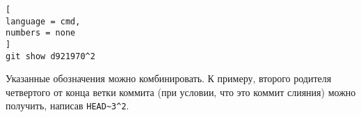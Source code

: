 \documentclass[%
	11pt,
	a4paper,
	utf8,
		]{article}
\begin{document}
\begin{lstlisting}[
language = cmd,
numbers = none
]
git show d921970^2
\end{lstlisting}

Указанные обозначения можно комбинировать. К примеру, второго родителя четвертого от конца ветки коммита (при условии, что это коммит слияния) можно получить, написав \lstinline{HEAD~3^2}.



\begin{thebibliography}{99}
	\bibitem{  }{  }
\end{thebibliography}

\end{document}
